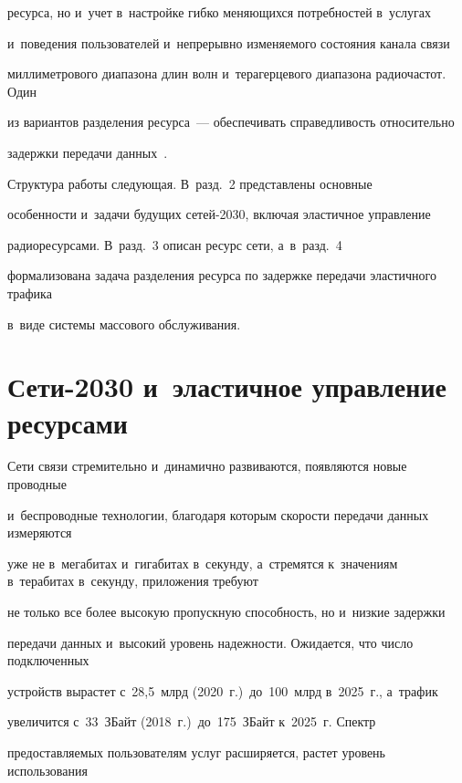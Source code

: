 ресурса, но и~учет в~настройке гибко меняющихся потребностей в~услугах 


и~поведения пользователей и~непрерывно изменяемого состояния канала связи 


миллиметрового диапазона длин волн и~терагерцевого диапазона радиочастот. Один 


из вариантов разделения ресурса~--- обеспечивать справедливость относительно 


задержки передачи данных~\cite{LopezSanchez2023,Kwon2023}.





Структура работы следующая. В~разд.~2 представлены основные


особенности и~задачи будущих се\-тей-2030, включая эластичное управление 


радиоресурсами. В~разд.~3 описан ресурс сети, а~в~разд.~4 


формализована задача разделения ресурса по задержке передачи эластичного трафика 


в~виде системы массового обслуживания.








\section{Сети-2030 и~эластичное управление ресурсами} \label{sec2}





Сети связи стремительно и~динамично развиваются, появляются новые проводные 


и~беспроводные технологии, благодаря которым скорости передачи данных измеряются 


уже не в~мегабитах и~гигабитах в~секунду, а~стремятся к~значениям в~терабитах в~секунду, приложения требуют 


не только все более высокую пропускную спо\-соб\-ность, но и~низкие задержки 


передачи данных и~высокий уровень надежности. Ожидается, что число подключенных 


устройств вырастет с~28,5~млрд (2020~г.)\ до~100~млрд в~2025~г., а~трафик 


увеличится с~33~ЗБайт (2018~г.)\ до~175~ЗБайт к~2025~г. Спектр 


предоставляемых пользователям услуг расширяется, растет уровень использования 



